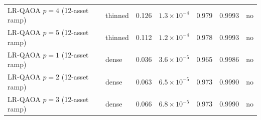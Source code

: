\begin{tabular}{@{}llccccc@{}}
LR-QAOA $p=4$ (12-asset ramp) & thinned & 0.126 & $1.3\times10^{-4}$ & 0.979 & 0.9993 & no\\
LR-QAOA $p=5$ (12-asset ramp) & thinned & 0.112 & $1.2\times10^{-4}$ & 0.978 & 0.9993 & no\\
LR-QAOA $p=1$ (12-asset ramp) & dense & 0.036 & $3.6\times10^{-5}$ & 0.965 & 0.9986 & no\\
LR-QAOA $p=2$ (12-asset ramp) & dense & 0.063 & $6.5\times10^{-5}$ & 0.973 & 0.9990 & no\\
LR-QAOA $p=3$ (12-asset ramp) & dense & 0.066 & $6.8\times10^{-5}$ & 0.973 & 0.9990 & no\\
\bottomrule\end{tabular}
